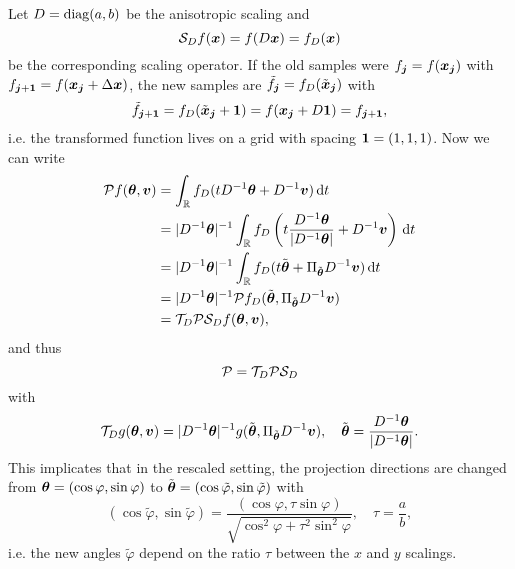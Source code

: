 \documentclass{amsart}
\newcommand*{\Dinv}{{\ensuremath{D^{-1}}}}
\renewcommand*{\phi}{\varphi}
\begin{document}
Let $D = \operatorname*{diag}(a,b)$ be the anisotropic scaling and
%
\begin{equation}
 \label{eq:vol_scaling}
 {\ensuremath{\mathcal{S}}}_D f({\boldsymbol{x}}) = f(D{\boldsymbol{x}}) = f_D({\boldsymbol{x}})
\end{equation}
%
be the corresponding scaling operator. If the old samples were $f_{\boldsymbol{j}} = f({\boldsymbol{x}}_{\boldsymbol{j}})$ with $f_{{\boldsymbol{j}}+{\boldsymbol{1}}} = f({\boldsymbol{x}}_{\boldsymbol{j}} + \Delta{\boldsymbol{x}})$, the new 
samples are $\tilde f_{{\boldsymbol{j}}} = f_D(\tilde{{\boldsymbol{x}}}_{\boldsymbol{j}})$ with 
%
\begin{equation*}
 \tilde f_{{\boldsymbol{j}}+{\boldsymbol{1}}} = f_D(\tilde{{\boldsymbol{x}}}_{\boldsymbol{j}} + {\boldsymbol{1}}) = f({\boldsymbol{x}}_{\boldsymbol{j}} + D{\boldsymbol{1}}) = f_{{\boldsymbol{j}}+{\boldsymbol{1}}},
\end{equation*}
%
i.e. the transformed function lives on a grid with spacing ${\boldsymbol{1}} = (1,1,1)$. Now we can write
%
\begin{align*}
 \OPP f(\Btheta, \Bv) 
 &= \int_\RR f_D(t \Dinv\Btheta + \Dinv\Bv)\, \D t \\
 &= \ABS{\Dinv\Btheta}^{-1} \int_\RR f_D\left(t \frac{\Dinv\Btheta}{\ABS{\Dinv\Btheta}} + \Dinv\Bv\right)\, \D t \\
 &= \ABS{\Dinv\Btheta}^{-1} \int_\RR f_D(t \tilde\Btheta + \Pi_{\tilde\Btheta} \Dinv\Bv)\, \D t \\
 &= \ABS{\Dinv\Btheta}^{-1} \OPP f_D (\tilde\Btheta, \Pi_{\tilde\Btheta} \Dinv\Bv) \\
 &= \OPT_D \OPP \OPS_D f(\Btheta, \Bv),
\end{align*}
%
and thus
%
\begin{equation}
 \label{eq:xray_fwd_scaling}
 {\ensuremath{\mathcal{P}}} = {\mathcal{T}}_D {\mathcal{P}} {\mathcal{S}}_D
\end{equation}
%
with 
%
\begin{equation}
 \label{eq:proj_scaling}
 \OPT_D g(\Btheta, \Bv) = \ABS{\Dinv\Btheta}^{-1} g(\tilde\Btheta, \Pi_{\tilde\Btheta} \Dinv\Bv),\quad 
 \tilde\Btheta = \frac{\Dinv\Btheta}{\ABS{\Dinv\Btheta}}.
\end{equation}
%
This implicates that in the rescaled setting, the projection directions are changed from $\Btheta = (\cos\phi, \sin\phi)$ to 
$\tilde\Btheta = (\cos\tilde\phi, \sin\tilde\phi)$ with 
%
\begin{equation}
 \label{eq:fwd_new_angles}
 (\cos\tilde\phi, \sin\tilde\phi) = \frac{(\cos\phi, \tau \sin\phi)}{\sqrt{\cos^2\phi + \tau^2\sin^2\phi}},\quad \tau = \frac{a}{b},
\end{equation}
%
i.e. the new angles $\tilde\phi$ depend on the ratio $\tau$ between the $x$ and $y$ scalings.
\end{document}
